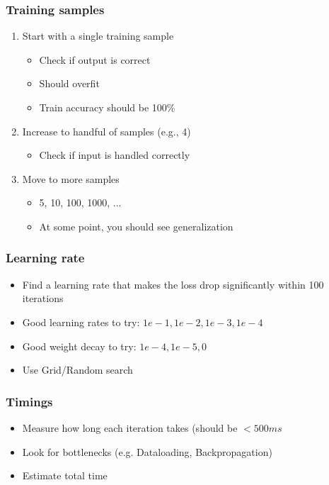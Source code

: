 \documentclass[10pt,a4paper]{article}
\begin{document}
\subsubsection{Training samples}
\begin{enumerate}
	\item Start with a single training sample
	\begin{itemize}
		\item Check if output is correct
		\item Should overfit
		\item Train accuracy should be 100\%
	\end{itemize}
	\item Increase to handful of samples (e.g., 4)
	\begin{itemize}
		\item Check if input is handled correctly
	\end{itemize}
	\item Move to more samples
	\begin{itemize}
		\item 5, 10, 100, 1000, ...
		\item At some point, you should see generalization
	\end{itemize}
\end{enumerate}

\subsubsection{Learning rate}
\begin{itemize}
	\item Find a learning rate that makes the loss drop significantly within 100 iterations
	\item Good learning rates to try: $1e-1, 1e-2, 1e-3, 1e-4$
	\item Good weight decay to try: $1e-4, 1e-5, 0$
	\item Use Grid/Random search
\end{itemize}

\subsubsection{Timings}
\begin{itemize}
	\item Measure how long each iteration takes (should be $< 500 ms$
	\item Look for bottlenecks (e.g. Dataloading, Backpropagation)
	\item Estimate total time
\end{itemize}
\end{document}
